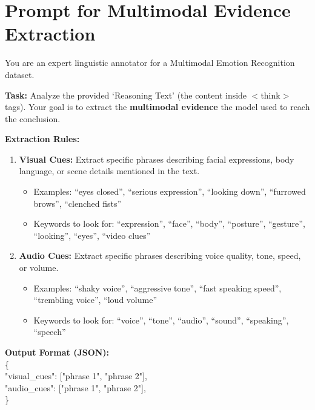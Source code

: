 \documentclass{article}
\theoremstyle{plain}
\theoremstyle{definition}
\theoremstyle{remark}
\begin{document}
\section{Prompt for Multimodal Evidence Extraction}
\begin{tcolorbox}[
    colback=blue!3,
    colframe=blue!33!black,
    colbacktitle=blue!9,
    coltitle=black,
    arc=2mm,
    auto outer arc,
    boxrule=0.35mm,
    left=3mm,
    right=3mm,
    top=2mm,
    bottom=2mm,
    width=\textwidth,
    title=\centering \textbf{Multimodal Evidence Extraction Prompt}
]
You are an expert linguistic annotator for a Multimodal Emotion Recognition dataset.

\textbf{Task:} Analyze the provided `Reasoning Text' (the content inside $<$think$>$ tags). Your goal is to extract the \textbf{multimodal evidence} the model used to reach the conclusion.

\textbf{Extraction Rules:}
\begin{enumerate}
    \item \textbf{Visual Cues:} Extract specific phrases describing facial expressions, body language, or scene details mentioned in the text.
    \begin{itemize}
        \item Examples: ``eyes closed'', ``serious expression'', ``looking down'', ``furrowed brows'', ``clenched fists''
        \item Keywords to look for: ``expression'', ``face'', ``body'', ``posture'', ``gesture'', ``looking'', ``eyes'', ``video clues''
    \end{itemize}

    \item \textbf{Audio Cues:} Extract specific phrases describing voice quality, tone, speed, or volume.
    \begin{itemize}
        \item Examples: ``shaky voice'', ``aggressive tone'', ``fast speaking speed'', ``trembling voice'', ``loud volume''
        \item Keywords to look for: ``voice'', ``tone'', ``audio'', ``sound'', ``speaking'', ``speech''
    \end{itemize}

\end{enumerate}

\textbf{Output Format (JSON):} \\
\{ \\
\hspace*{1em} "visual\_cues": ["phrase 1", "phrase 2"], \\
\hspace*{1em} "audio\_cues": ["phrase 1", "phrase 2"], \\
\}


\end{tcolorbox}
\end{document}
